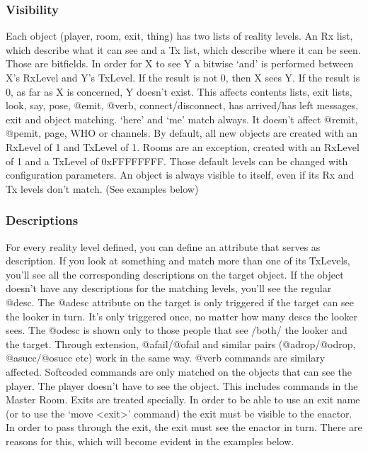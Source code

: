 \documentclass[letterpaper,10pt,english]{sphinxmanual}
\begin{document}
\subsubsection{Visibility}
\label{\detokenize{advanced:visibility}}
\sphinxAtStartPar
Each object (player, room, exit, thing) has two lists of reality levels.
An Rx list, which describe what it can see and a Tx list, which describe
where it can be seen. Those are bitfields. In order for X to see Y a bitwise
‘and’ is performed between X’s RxLevel and Y’s TxLevel. If the result is not
0, then X sees Y. If the result is 0, as far as X is concerned, Y doesn’t
exist. This affects contents lists, exit lists, look, say, pose, @emit,
@verb, connect/disconnect, has arrived/has left messages, exit and object
matching. ‘here’ and ‘me’ match always.
It doesn’t affect @remit, @pemit, page, WHO or channels.
By default, all new objects are created with an RxLevel of 1 and TxLevel of
1. Rooms are an exception, created with an RxLevel of 1 and a TxLevel of
0xFFFFFFFF. Those default levels can be changed with configuration
parameters.
An object is always visible to itself, even if its Rx and Tx levels don’t
match. (See examples below)


\subsubsection{Descriptions}
\label{\detokenize{advanced:descriptions}}
\sphinxAtStartPar
For every reality level defined, you can define an attribute that serves as
description. If you look at something and match more than one of its
TxLevels, you’ll see all the corresponding descriptions on the target
object. If the object doesn’t have any descriptions for the matching levels,
you’ll see the regular @desc.
The @adesc attribute on the target is only triggered if the target can see
the looker in turn. It’s only triggered once, no matter how many descs the
looker sees. The @odesc is shown only to those people that see /both/ the
looker and the target.
Through extension, @afail/@ofail and similar pairs (@adrop/@odrop,
@asucc/@osucc etc) work in the same way. @verb commands are similary
affected.
Softcoded commands are only matched on the objects that can see the player.
The player doesn’t have to see the object. This includes commands in the
Master Room.
Exits are treated specially. In order to be able to use an exit name (or to
use the ‘move \textless{}exit\textgreater{}’ command) the exit must be visible to the enactor. In
order to pass through the exit, the exit must see the enactor in turn. There
are reasons for this, which will become evident in the examples below.
\end{document}
